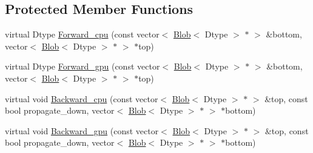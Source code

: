 \subsection*{Protected Member Functions}
\begin{DoxyCompactItemize}
\item 
virtual Dtype \hyperlink{classcaffe_1_1_convolution_layer_a53eb4114d914f019bc873818d4f8e53b}{Forward\+\_\+cpu} (const vector$<$ \hyperlink{classcaffe_1_1_blob}{Blob}$<$ Dtype $>$ $\ast$ $>$ \&bottom, vector$<$ \hyperlink{classcaffe_1_1_blob}{Blob}$<$ Dtype $>$ $\ast$ $>$ $\ast$top)
\item 
virtual Dtype \hyperlink{classcaffe_1_1_convolution_layer_a1feac725539612918553e6b7bf299b4b}{Forward\+\_\+gpu} (const vector$<$ \hyperlink{classcaffe_1_1_blob}{Blob}$<$ Dtype $>$ $\ast$ $>$ \&bottom, vector$<$ \hyperlink{classcaffe_1_1_blob}{Blob}$<$ Dtype $>$ $\ast$ $>$ $\ast$top)
\item 
virtual void \hyperlink{classcaffe_1_1_convolution_layer_a977898d74cd37fa2557f74322d419575}{Backward\+\_\+cpu} (const vector$<$ \hyperlink{classcaffe_1_1_blob}{Blob}$<$ Dtype $>$ $\ast$ $>$ \&top, const bool propagate\+\_\+down, vector$<$ \hyperlink{classcaffe_1_1_blob}{Blob}$<$ Dtype $>$ $\ast$ $>$ $\ast$bottom)
\item 
virtual void \hyperlink{classcaffe_1_1_convolution_layer_a451a90070f9600b3bc33e0a9f9356ab2}{Backward\+\_\+gpu} (const vector$<$ \hyperlink{classcaffe_1_1_blob}{Blob}$<$ Dtype $>$ $\ast$ $>$ \&top, const bool propagate\+\_\+down, vector$<$ \hyperlink{classcaffe_1_1_blob}{Blob}$<$ Dtype $>$ $\ast$ $>$ $\ast$bottom)
\end{DoxyCompactItemize}

